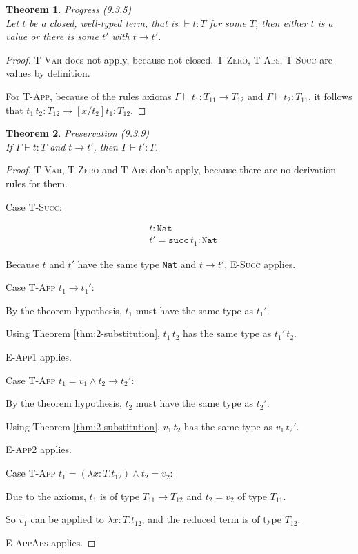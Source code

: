 \documentclass[13pt, a4paper]{article}
\newtheorem{theorem}{Theorem}
\begin{document}

\begin{theorem}
Progress (9.3.5)\\
Let $t$ be a closed, well-typed term, that is $\vdash t:T$ for some $T$, then either $t$ is a value or there is some $t'$ with $t\to t'$.
\end{theorem}

\begin{proof}
\textsc{T-Var} does not apply, because not closed. \textsc{T-Zero}, \textsc{T-Abs}, \textsc{T-Succ} are values by definition.

For \textsc{T-App}, because of the rules axioms $\Gamma \vdash t_1 : T_{11} \to T_{12}$ and $\Gamma \vdash t_2 : T_{11}$, it follows that $t_1\,t_2 : T_{12} \to [x/t_2]t_1 : T_{12}$.
\end{proof}


\begin{theorem}
Preservation (9.3.9) \\
If $\Gamma \vdash t:T$ and $t\to t'$, then $\Gamma \vdash t' : T$.
\end{theorem}

\begin{proof}
\textsc{T-Var}, \textsc{T-Zero} and \textsc{T-Abs} don't apply, because there are no derivation rules for them.

\noindent Case \textsc{T-Succ}:

\begin{align}
& t : \texttt{Nat} \\
& t' = \texttt{succ}\,t_1 : \texttt{Nat}
\end{align}

Because $t$ and $t'$ have the same type \texttt{Nat} and $t \to t'$, \textsc{E-Succ} applies.

\noindent Case \textsc{T-App} $t_1 \to t_1'$:

By the theorem hypothesis, $t_1$ must have the same type as $t_1'$.

Using Theorem \ref{thm:2-substitution}, $t_1\,t_2$ has the same type as $t_1'\,t_2$.

\textsc{E-App1} applies.

\noindent Case \textsc{T-App} $t_1 = v_1 \land t_2\to t_2'$:

By the theorem hypothesis, $t_2$ must have the same type as $t_2'$.

Using Theorem \ref{thm:2-substitution}, $v_1\,t_2$ has the same type as $v_1\,t_2'$.

\textsc{E-App2} applies.

\noindent Case \textsc{T-App} $t_1 = (\lambda x : T.t_{12})\land t_2 = v_2$:

Due to the axioms, $t_1$ is of type $T_{11}\to T_{12}$ and $t_2 = v_2$ of type $T_{11}$.

So $v_1$ can be applied to $\lambda x : T.t_{12}$, and the reduced term is of type $T_{12}$.

\textsc{E-AppAbs} applies.

\end{proof}
\end{document}
